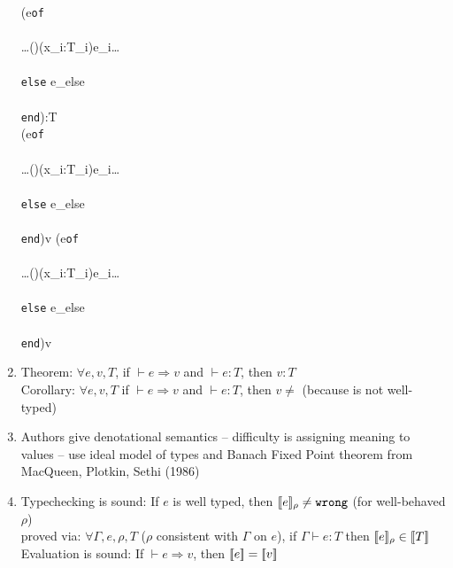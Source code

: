 \documentclass[12pt]{article}	%
\begin{document}
\begin{enumerate}
	          {\Gamma\vdash(\typecase\;e\;\texttt{of} \\\\
	                        \ldots()(x_i:T_i)\;e_i\ldots\\\\
	                        \texttt{else}\; e_{else}\\\\
	                        \texttt{end}):T}\\
	           {\vdash(\typecase\;e\;\texttt{of}\\\\
	            \ldots()(x_i:T_i)\;e_i\ldots\\\\
	            \texttt{else}\; e_{else}\\\\
	            \texttt{end})\Rightarrow v}
	           {\vdash(\typecase\;e\;\texttt{of}\\\\
	            \ldots()(x_i:T_i)\;e_i\ldots\\\\
	            \texttt{else}\; e_{else}\\\\
	            \texttt{end})\Rightarrow v}
	\item Theorem: $\forall e, v, T$, if $\vdash e \Rightarrow v$ and $\vdash e:T$, then $v:T$\\
	      Corollary: $\forall e, v, T$ if $\vdash e \Rightarrow v$ and $\vdash e:T$, then $v \neq$ \wrong (because \wrong is not well-typed)
	\item Authors give denotational semantics -- difficulty is assigning meaning to \Dynamic values -- use ideal model of types and Banach Fixed Point theorem from MacQueen, Plotkin, Sethi (1986)
	\item Typechecking is sound: If $e$ is well typed, then $[\![e]\!]_\rho \neq \texttt{wrong}$ (for well-behaved $\rho$)\\
	                             proved via: $\forall\Gamma,e,\rho,T$ ($\rho$ consistent with $\Gamma$ on $e$), if $\Gamma\vdash e:T$ then $[\![e]\!]_\rho \in [\![T]\!]$\\
	      Evaluation is sound: If $\vdash e \Rightarrow v$, then $[\![e]\!] = [\![v]\!]$
\end{enumerate}



\end{document}
